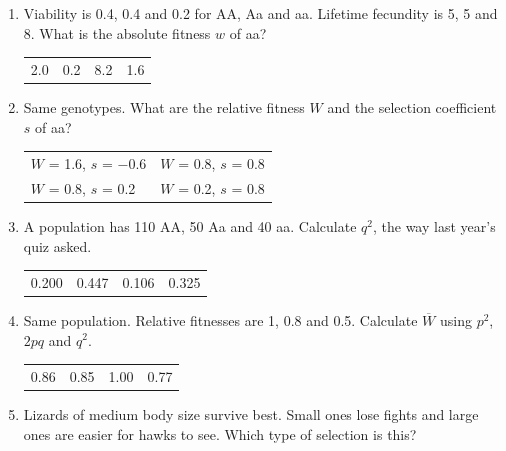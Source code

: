 \documentclass[11pt]{article}
\newcommand{\work}[1]{\par\vspace{#1}}
\begin{document}
\begin{enumerate}[label=\textbf{\arabic*.}, leftmargin=2em, itemsep=1.4em]
\item Viability is 0.4, 0.4 and 0.2 for AA, Aa and aa. Lifetime fecundity is 5, 5 and 8. What is the absolute fitness \(w\) of aa?
\par\smallskip\noindent\begin{tabularx}{\linewidth}{@{}YYYY@{}}
2.0 & 0.2 & 8.2 & 1.6 \\
\end{tabularx}
\work{1.6cm}
\item Same genotypes. What are the relative fitness \(W\) and the selection coefficient \(s\) of aa?
\par\smallskip\noindent\begin{tabularx}{\linewidth}{@{}YY@{}}
\(W\) = 1.6, \(s\) = \(-\)0.6 & \(W\) = 0.8, \(s\) = 0.8 \\[3pt]
\(W\) = 0.8, \(s\) = 0.2 & \(W\) = 0.2, \(s\) = 0.8 \\
\end{tabularx}
\item A population has 110 AA, 50 Aa and 40 aa. Calculate \(q^2\), the way last year's quiz asked.
\par\smallskip\noindent\begin{tabularx}{\linewidth}{@{}YYYY@{}}
0.200 & 0.447 & 0.106 & 0.325 \\
\end{tabularx}
\work{1.6cm}
\item Same population. Relative fitnesses are 1, 0.8 and 0.5. Calculate \(\overline{W}\) using \(p^2\), \(2pq\) and \(q^2\).
\par\smallskip\noindent\begin{tabularx}{\linewidth}{@{}YYYY@{}}
0.86 & 0.85 & 1.00 & 0.77 \\
\end{tabularx}
\work{1.6cm}
\item Lizards of medium body size survive best. Small ones lose fights and large ones are easier for hawks to see. Which type of selection is this?

\end{enumerate}
\end{document}

